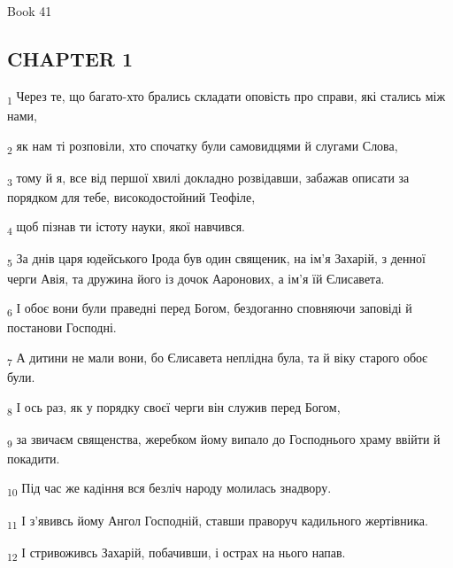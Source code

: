Book 41
\subsection{CHAPTER 1}
\begin{tcolorbox}
\textsubscript{1} Через те, що багато-хто брались складати оповість про справи, які стались між нами,
\end{tcolorbox}
\begin{tcolorbox}
\textsubscript{2} як нам ті розповіли, хто спочатку були самовидцями й слугами Слова,
\end{tcolorbox}
\begin{tcolorbox}
\textsubscript{3} тому й я, все від першої хвилі докладно розвідавши, забажав описати за порядком для тебе, високодостойний Теофіле,
\end{tcolorbox}
\begin{tcolorbox}
\textsubscript{4} щоб пізнав ти істоту науки, якої навчився.
\end{tcolorbox}
\begin{tcolorbox}
\textsubscript{5} За днів царя юдейського Ірода був один священик, на ім'я Захарій, з денної черги Авія, та дружина його із дочок Ааронових, а ім'я їй Єлисавета.
\end{tcolorbox}
\begin{tcolorbox}
\textsubscript{6} І обоє вони були праведні перед Богом, бездоганно сповняючи заповіді й постанови Господні.
\end{tcolorbox}
\begin{tcolorbox}
\textsubscript{7} А дитини не мали вони, бо Єлисавета неплідна була, та й віку старого обоє були.
\end{tcolorbox}
\begin{tcolorbox}
\textsubscript{8} І ось раз, як у порядку своєї черги він служив перед Богом,
\end{tcolorbox}
\begin{tcolorbox}
\textsubscript{9} за звичаєм священства, жеребком йому випало до Господнього храму ввійти й покадити.
\end{tcolorbox}
\begin{tcolorbox}
\textsubscript{10} Під час же кадіння вся безліч народу молилась знадвору.
\end{tcolorbox}
\begin{tcolorbox}
\textsubscript{11} І з'явивсь йому Ангол Господній, ставши праворуч кадильного жертівника.
\end{tcolorbox}
\begin{tcolorbox}
\textsubscript{12} І стривоживсь Захарій, побачивши, і острах на нього напав.
\end{tcolorbox}
